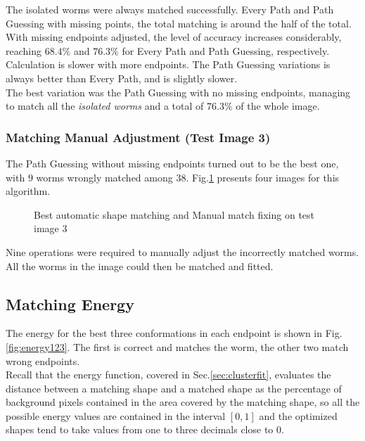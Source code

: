 The isolated worms were always matched successfully.
Every Path and Path Guessing with missing points, 
the total matching is around the half of the total. 
With missing endpoints adjusted, the level of accuracy increases considerably,
reaching $68.4\%$ and $76.3\%$ for Every Path and Path Guessing, respectively.\\
Calculation is slower with more endpoints.
The Path Guessing variations is always better than Every Path, and is slightly slower.\\
The best variation was the Path Guessing with no missing endpoints, managing
to match all the \emph{isolated worms} and a total of $76.3\%$ of the 
whole image.

\subsubsection*{Matching Manual Adjustment (Test Image 3)}

The Path Guessing without missing endpoints turned out to be the best one, with $9$ worms wrongly matched among $38$.
Fig.\ref{fig:best3} presents four images for this algorithm.

\begin{figure}[h!]
  \centering
\qquad
\qquad
\qquad
  \caption{Best automatic shape matching and Manual match fixing on test image 3}
  \label{fig:best3}
\end{figure}


Nine operations were required to manually adjust the incorrectly matched worms.
All the worms in the image could then be matched and fitted.

\subsection{Matching Energy}

The energy for the best three conformations in each endpoint is shown in Fig.\ref{fig:energy123}.
The first is correct and matches the worm, the other two match wrong endpoints.\\
Recall that the energy function, covered
in Sec.\ref{sec:clusterfit}, evaluates the distance between a matching shape
and a matched shape as the percentage of background pixels contained in the 
area covered by the matching shape, so all the possible energy values are
contained in the interval $[0,1]$ and the optimized shapes tend to take values
from one to three decimals close to $0$.


